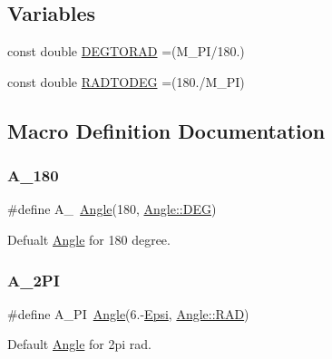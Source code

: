 \subsection*{Variables}
\begin{DoxyCompactItemize}
\item 
const double \mbox{\hyperlink{maths_8hh_abe8c019db43eb490b67df53e48a69d28}{D\+E\+G\+T\+O\+R\+AD}} =(M\+\_\+\+PI/180.)
\item 
const double \mbox{\hyperlink{maths_8hh_abbe9061bc2ecde6e056b25705a50a829}{R\+A\+D\+T\+O\+D\+EG}} =(180./M\+\_\+\+PI)
\end{DoxyCompactItemize}


\subsection{Macro Definition Documentation}
\mbox{\label{maths_8hh_ac37f3aecadc99641dd1c8b4c81d96f7e}} 
\subsubsection{\texorpdfstring{A\_180}{A\_180}}
{\footnotesize\ttfamily \#define A\+\_~\mbox{\hyperlink{class_angle}{Angle}}(180, \mbox{\hyperlink{class_angle_a4f7b9849ce8780bcba95ca3ee45cff77a65e2aa4bc05730c9c2e8fdaf73612282}{Angle\+::\+D\+EG}})}



Defualt \mbox{\hyperlink{class_angle}{Angle}} for 180 degree. 

\mbox{\label{maths_8hh_ad7760000c41920a1ae5cf0f6bf0e4c77}} 
\subsubsection{\texorpdfstring{A\_2PI}{A\_2PI}}
{\footnotesize\ttfamily \#define A\+\_\+PI~\mbox{\hyperlink{class_angle}{Angle}}(6.-\/\mbox{\hyperlink{maths_8hh_a78802b279ab85021d7f6bffe51621703}{Epsi}}, \mbox{\hyperlink{class_angle_a4f7b9849ce8780bcba95ca3ee45cff77a93ab6b68075fd7a6fe724fbde5b13c1f}{Angle\+::\+R\+AD}})}



Default \mbox{\hyperlink{class_angle}{Angle}} for 2pi rad. 

\mbox{\label{maths_8hh_ae46eba4b5423f51b80f3446e128c6476}} 

